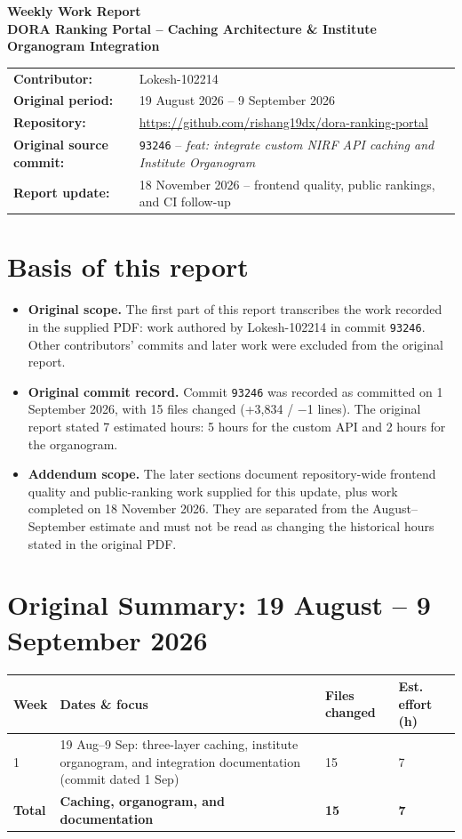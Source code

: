 \documentclass[11pt,a4paper]{article}
\begin{document}
{\Large\bfseries Weekly Work Report}\\[4pt]
{\large\bfseries\color{primary} DORA Ranking Portal -- Caching Architecture \& Institute Organogram Integration}\\[6pt]
\begin{tabular}{@{}ll@{}}
\textbf{Contributor:} & Lokesh-102214 \\
\textbf{Original period:} & 19 August 2026 -- 9 September 2026 \\
\textbf{Repository:} & \url{https://github.com/rishang19dx/dora-ranking-portal} \\
\textbf{Original source commit:} & \texttt{93246} -- \textit{feat: integrate custom NIRF API caching and Institute Organogram} \\
\textbf{Report update:} & 18 November 2026 -- frontend quality, public rankings, and CI follow-up
\end{tabular}

\section*{Basis of this report}
\begin{itemize}[leftmargin=1.4em,itemsep=2pt]
  \item \textbf{Original scope.} The first part of this report transcribes the work recorded in the supplied PDF: work authored by Lokesh-102214 in commit \texttt{93246}. Other contributors' commits and later work were excluded from the original report.
  \item \textbf{Original commit record.} Commit \texttt{93246} was recorded as committed on 1 September 2026, with 15 files changed (+3,834 / $-$1 lines). The original report stated 7 estimated hours: 5 hours for the custom API and 2 hours for the organogram.
  \item \textbf{Addendum scope.} The later sections document repository-wide frontend quality and public-ranking work supplied for this update, plus work completed on 18 November 2026. They are separated from the August--September estimate and must not be read as changing the historical hours stated in the original PDF.
\end{itemize}

\section*{Original Summary: 19 August -- 9 September 2026}
\begin{table}[h]
\centering
\renewcommand{\arraystretch}{1.2}
\begin{tabular}{p{1.2cm}p{7.3cm}p{2.0cm}p{1.6cm}}
\toprule
\textbf{Week} & \textbf{Dates \& focus} & \textbf{Files changed} & \textbf{Est. effort (h)} \\
\midrule
1 & 19 Aug--9 Sep: three-layer caching, institute organogram, and integration documentation (commit dated 1 Sep) & 15 & 7 \\
\midrule
\textbf{Total} & \textbf{Caching, organogram, and documentation} & \textbf{15} & \textbf{7} \\
\bottomrule
\end{tabular}
\end{table}
\end{document}
